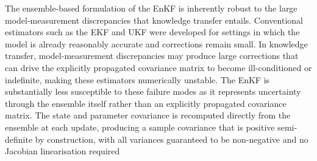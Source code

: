 {\color{blue} The ensemble-based formulation of the EnKF is inherently robust to the large model-measurement discrepancies that knowledge transfer entails. Conventional estimators such as the EKF and UKF were developed for settings in which the model is already reasonably accurate and corrections remain small. In knowledge transfer, model-measurement discrepancies may produce large corrections that can drive the explicitly propagated covariance matrix to become ill-conditioned or indefinite, making these estimators numerically unstable. The EnKF is substantially less susceptible to these failure modes as it represents uncertainty through the ensemble itself rather than an explicitly propagated covariance matrix. The state and parameter covariance is recomputed directly from the ensemble at each update, producing a sample covariance that is positive semi-definite by construction, with all variances guaranteed to be non-negative and no Jacobian linearisation required \cite{Evensen2009TheSystems}}

